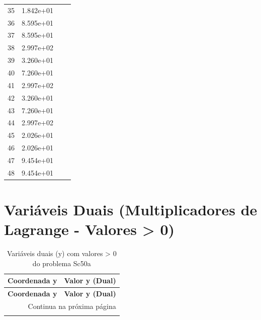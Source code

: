 \documentclass[12pt]{article}
\begin{document}
\begin{longtable}{@{}cccc@{}}
35 & 1.842e+01 &  &  \\
36 & 8.595e+01 &  &  \\
37 & 8.595e+01 &  &  \\
38 & 2.997e+02 &  &  \\
39 & 3.260e+01 &  &  \\
40 & 7.260e+01 &  &  \\
41 & 2.997e+02 &  &  \\
42 & 3.260e+01 &  &  \\
43 & 7.260e+01 &  &  \\
44 & 2.997e+02 &  &  \\
45 & 2.026e+01 &  &  \\
46 & 2.026e+01 &  &  \\
47 & 9.454e+01 &  &  \\
48 & 9.454e+01 &  &  \\

\bottomrule
\end{longtable}


\section{Variáveis Duais (Multiplicadores de Lagrange - Valores > 0)}

\begin{longtable}{@{}cc@{}}
\caption{Variáveis duais (y) com valores > 0 do problema Sc50a} \\
\toprule
\textbf{Coordenada y} & \textbf{Valor y (Dual)} \\
\midrule
\endfirsthead

\toprule
\textbf{Coordenada y} & \textbf{Valor y (Dual)} \\
\midrule
\endhead

\midrule \multicolumn{2}{r}{{Continua na próxima página}} \\ \midrule
\endfoot

\bottomrule
\endlastfoot

\bottomrule
\end{longtable}
\end{document}
